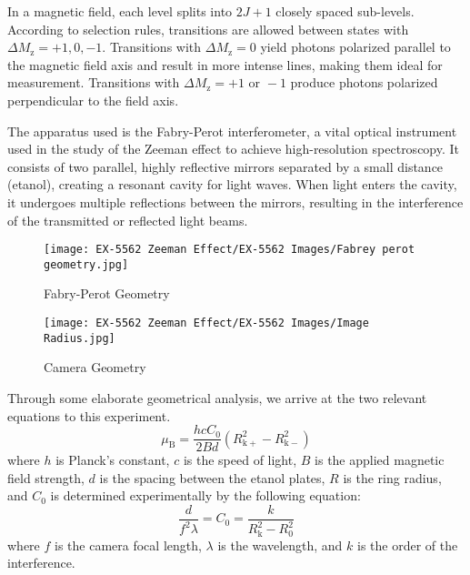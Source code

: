 \documentclass[11pt]{article}
\begin{document}
	In a magnetic field, each level splits into $2J+1$ closely spaced sub-levels. According to selection rules, transitions are allowed between states with $\Delta M_\mathrm{z} = +1, 0, -1$. Transitions with $\Delta M_\mathrm{z} = 0$ yield photons polarized parallel to the magnetic field axis and result in more intense lines, making them ideal for measurement. Transitions with $\Delta M_\mathrm{z} = +1 \text{ or } -1$ produce photons polarized perpendicular to the field axis.
	
	The apparatus used is the Fabry-Perot interferometer, a vital optical instrument used in the study of the Zeeman effect to achieve high-resolution spectroscopy. It consists of two parallel, highly reflective mirrors separated by a small distance (etanol), creating a resonant cavity for light waves. When light enters the cavity, it undergoes multiple reflections between the mirrors, resulting in the interference of the transmitted or reflected light beams.
	
	\begin{figure}[h!]
		\centering
		\begin{minipage}{0.45\textwidth}
			\centering
			\texttt{[image: EX-5562 Zeeman Effect/EX-5562 Images/Fabrey perot geometry.jpg]}
			\caption{Fabry-Perot Geometry}
			\label{fig:image1}
		\end{minipage}\hfill
		\begin{minipage}{0.45\textwidth}
			\centering
			\texttt{[image: EX-5562 Zeeman Effect/EX-5562 Images/Image Radius.jpg]}
			\caption{Camera Geometry}
			\label{fig:image2}
		\end{minipage}
	\end{figure}
	
	Through some elaborate geometrical analysis, we arrive at the two relevant equations to this experiment.
	\begin{equation}
		\mu_\mathrm{B} = \frac{hcC_0}{2Bd} \left( R^2_{\mathrm{k+}} - R^2_{\mathrm{k-}} \right) \label{eq:4}
	\end{equation}
	where \(h\) is Planck's constant, \(c\) is the speed of light, \(B\) is the applied magnetic field strength, \(d\) is the spacing between the etanol plates, \(R\) is the ring radius, and \(C_0\) is determined experimentally by the following equation:
	\begin{equation}
		\frac{d}{f^2 \lambda} = C_0 = \frac{k}{R^2_\mathrm{k} - R^2_0} \label{eq:5}
	\end{equation}
	where \(f\) is the camera focal length, \(\lambda\) is the wavelength, and \(k\) is the order of the interference.
	
\end{document}
